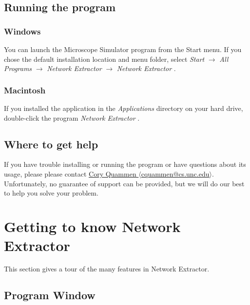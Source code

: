 \documentclass[11pt,titlepage,twoside]{article}
\begin{document}
\subsection{Running the program}

\subsubsection{Windows}

You can launch the Microscope Simulator program from the Start menu. If you chose the default installation location and menu folder, select \emph{Start} $\rightarrow$ \emph{All Programs} $\rightarrow$ \emph{Network Extractor \ProgramVersionNoSpace} $\rightarrow$ \emph{Network Extractor \ProgramVersionNoSpace}.

\subsubsection{Macintosh}

If you installed the application in the \emph{Applications} directory on your hard drive, double-click the program \emph{Network Extractor \ProgramVersionNoSpace}.

\subsection{Where to get help}

If you have trouble installing or running the program or have questions about its usage, please please contact  \href{mailto:cquammen@cs.unc.edu}{Cory Quammen $\langle$cquammen@cs.unc.edu$\rangle$}. Unfortunately, no guarantee of support can be provided, but we will do our best to help you solve your problem.

\section{Getting to know Network Extractor}

This section gives a tour of the many features in Network Extractor.

\subsection{Program Window}
\end{document}
